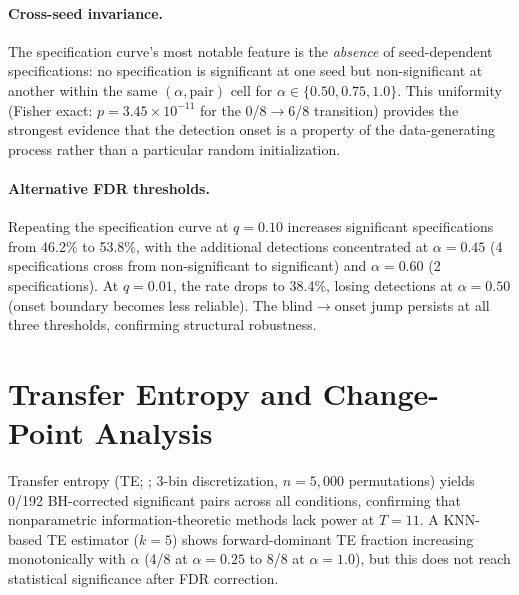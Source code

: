 \paragraph{Cross-seed invariance.}
The specification curve's most notable feature is the \emph{absence} of seed-dependent specifications: no specification is significant at one seed but non-significant at another within the same $(\alpha, \text{pair})$ cell for $\alpha \in \{0.50, 0.75, 1.0\}$.
This uniformity (Fisher exact: $p = 3.45 \times 10^{-11}$ for the 0/8$\to$6/8 transition) provides the strongest evidence that the detection onset is a property of the data-generating process rather than a particular random initialization.

\paragraph{Alternative FDR thresholds.}
Repeating the specification curve at $q{=}0.10$ increases significant specifications from 46.2\% to 53.8\%, with the additional detections concentrated at $\alpha{=}0.45$ (4 specifications cross from non-significant to significant) and $\alpha{=}0.60$ (2 specifications).
At $q{=}0.01$, the rate drops to 38.4\%, losing detections at $\alpha{=}0.50$ (onset boundary becomes less reliable).
The blind$\to$onset jump persists at all three thresholds, confirming structural robustness.

\section{Transfer Entropy and Change-Point Analysis}
\label{app:transfer_entropy}
\label{app:te_mi}

Transfer entropy (TE; \citealp{schreiber2000measuring}; 3-bin discretization, $n{=}5{,}000$ permutations) yields 0/192 BH-corrected significant pairs across all conditions, confirming that nonparametric information-theoretic methods lack power at $T{=}11$.
A KNN-based TE estimator ($k{=}5$) shows forward-dominant TE fraction increasing monotonically with $\alpha$ (4/8 at $\alpha{=}0.25$ to 8/8 at $\alpha{=}1.0$), but this does not reach statistical significance after FDR correction.

